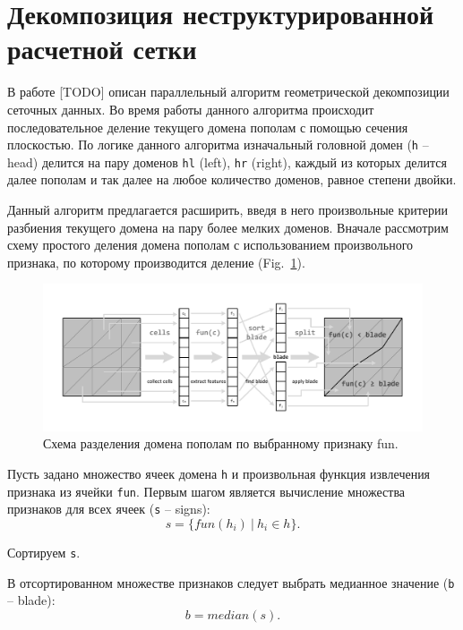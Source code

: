 \documentclass[
11pt,%
tightenlines,%
twoside,%
onecolumn,%
nofloats,%
nobibnotes,%
nofootinbib,%
superscriptaddress,%
noshowpacs,%
centertags]%
{revtex4}
\begin{document}
\section{Декомпозиция неструктурированной расчетной сетки}

В работе [TODO] описан параллельный алгоритм геометрической декомпозиции сеточных данных.
Во время работы данного алгоритма происходит последовательное деление текущего домена пополам с помощью сечения плоскостью.
По логике данного алгоритма изначальный головной домен (\texttt{h} -- head) делится на пару доменов \texttt{hl} (left), \texttt{hr} (right), каждый из которых делится далее пополам и так далее на любое количество доменов, равное степени двойки.

Данный алгоритм предлагается расширить, введя в него произвольные критерии разбиения текущего домена на пару более мелких доменов.
Вначале рассмотрим схему простого деления домена пополам с использованием произвольного признака, по которому производится деление (Fig.~\ref{fig:03-split}).

\begin{figure}[h]
\includegraphics[width=1.0\textwidth]{pics/03-split.pdf}
\caption{Схема разделения домена пополам по выбранному признаку fun.}\label{fig:03-split}
\end{figure}

Пусть задано множество ячеек домена \texttt{h} и произвольная функция извлечения признака из ячейки \texttt{fun}.
Первым шагом является вычисление множества признаков для всех ячеек (\texttt{s} -- signs):
\begin{equation*}
	s = \{fun(h_i)~|~h_i \in h\}.
\end{equation*}

Сортируем \texttt{s}.

В отсортированном множестве признаков следует выбрать медианное значение (\texttt{b} -- blade):
\begin{equation*}
	b = median(s).
\end{equation*}
\end{document}
